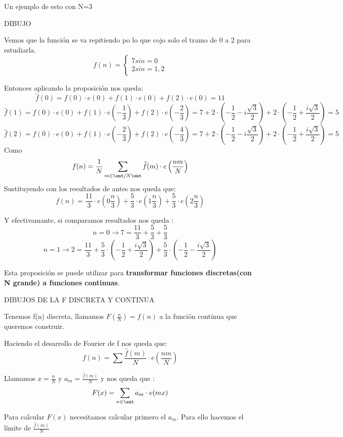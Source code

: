 \begin{example}
	Un ejemplo de esto con N=3
	
	DIBUJO
	
	Vemos que la función se va repitiendo po lo que cojo solo el tramo de 0 a 2 para estudiarla.
	$$f(n) = \begin{cases}
	7 si n= 0\\
	2 si n = 1 , 2
	\end{cases}$$
	
	Entonces aplicando la proposición nos queda:
	$$\widehat{f}(0) = f(0)\cdot e(0) + f(1)\cdot e(0) + f(2) \cdot e(0) =  11$$
	$$\widehat{f}(1) = f(0)\cdot e(0) + f(1)\cdot e\left(-\frac{1}{3}\right) + f(2)\cdot e\left(-\frac{2}{3}\right) = 7 + 2\cdot\left(-\frac{1}{2} -i\frac{\sqrt{3}}{2}\right) + 2\cdot \left(-\frac{1}{2} + \frac{i\sqrt{3}}{2}\right) = 5$$
	$$\widehat{f}(2) = f(0)\cdot e(0) + f(1)\cdot e\left(- \frac{2}{3}\right) + f(2) \cdot e\left(-\frac{4}{3}\right) = 7 + 2\cdot\left(-\frac{1}{2} -i\frac{\sqrt{3}}{2}\right) + 2\cdot \left(-\frac{1}{2} + \frac{i\sqrt{3}}{2}\right) = 5$$
	Como 
	$$f(n) = \frac{1}{N} \sum_{m\in \ent/ N\ent} \widehat{f}(m) \cdot e\left(\frac{nm}{N}\right)$$
	Sustituyendo con los resultados de antes nos queda que:
	$$f(n) = \frac{11}{3}\cdot e\left(0 \frac{n}{3}\right) + \frac{5}{3}\cdot e\left(1 \frac{n}{3}\right) + \frac{5}{3} \cdot e\left(2 \frac{n}{3}\right)$$
	
	Y efectivamante, si comparamos resultados nos queda :
	$$n = 0 \rightarrow 7 = \frac{11}{3} + \frac{5}{3} + \frac{5}{3}$$
	$$n = 1 \rightarrow 2 = \frac{11}{3} + \frac{5}{3} \cdot \left(- \frac{1}{2} + \frac{i \sqrt{3}}{2}\right) + \frac{5}{3} \cdot \left(- \frac{1}{2} -\frac{i \sqrt{3}}{2}\right)$$
\end{example}

Esta proposición se puede utilizar para \textbf{transformar funciones discretas(con N grande) a funciones continuas}.

DIBUJOS DE LA F DISCRETA Y CONTINUA

Tenemos f(n) discreta, llamamos $F\left(\frac{n}{N}\right) = f(n)$ a la función continua que queremos construir.


Haciendo el desarrollo de Fourier de f nos queda que:
$$f(n) = \sum \frac{\widehat{f}(m)}{N} \cdot e\left(\frac{nm}{N}\right)$$

Llamamos $x = \frac{n}{N}$ y $a_m= \frac{\widehat{f}(m)}{N}$ y nos queda que :
$$F(x) = \sum_{n\in \ent } a_m \cdot e(mx)$$

Para calcular $F(x)$ necesitamos calcular primero el $a_m$. Para ello hacemos el límite de $\frac{\widehat{f}(m)}{N}$

